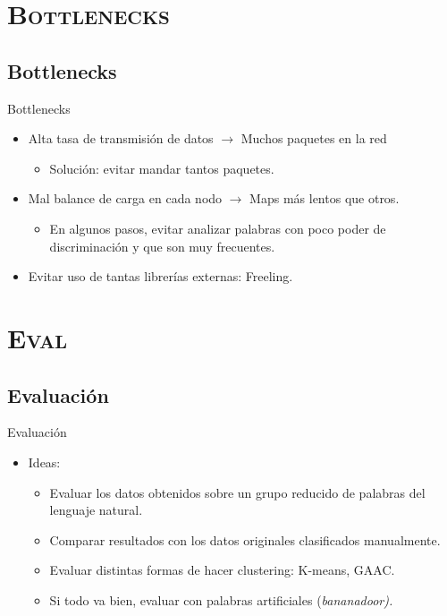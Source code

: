 \documentclass[xcolor=x11names,compress]{beamer}
\renewcommand{\(}{\begin{columns}}
\renewcommand{\)}{\end{columns}}
\newcommand{\<}[1]{\begin{column}{#1}}
\renewcommand{\>}{\end{column}}
\begin{document}
\section{\scshape Bottlenecks}
\subsection{Bottlenecks}
\begin{frame}{Bottlenecks}
\begin{itemize}
\item Alta tasa de transmisión de datos $\rightarrow$ Muchos paquetes en la red
\begin{itemize}
\item Solución: evitar mandar tantos paquetes.
\end{itemize}
\item Mal balance de carga en cada nodo $\rightarrow$ Maps más lentos que otros.
\begin{itemize}
\item En algunos pasos, evitar analizar palabras con poco poder de discriminación y que son muy frecuentes.
\end{itemize}
\item Evitar uso de tantas librerías externas: Freeling.
\end{itemize}
\end{frame}

\section{\scshape Eval}
\subsection{Evaluación}
\begin{frame}{Evaluación}
\begin{itemize}
\item Ideas:
\begin{itemize}
\item Evaluar los datos obtenidos sobre un grupo reducido de palabras del lenguaje natural.
\item Comparar resultados con los datos originales clasificados manualmente.
\item Evaluar distintas formas de hacer clustering: K-means, GAAC.
\item Si todo va bien, evaluar con palabras artificiales (\em bananadoor\em).
\end{itemize}
\end{itemize}
\end{frame}
\end{document}
